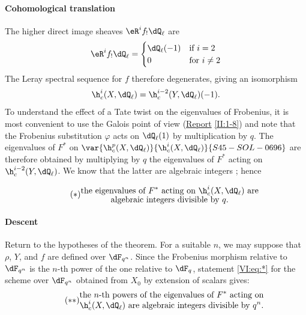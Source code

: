 \paragraph{Cohomological translation}
The higher direct image sheaves $\eR^i f_!\dQ_\ell$ are 
\[
  \eR^i f_!\dQ_\ell = \begin{cases}
                       \dQ_\ell(-1) & \text{if $i = 2$} \\
                       0            & \text{for $i\ne 2$}
                     \end{cases}
\]
The Leray spectral sequence for $f$ therefore degenerates, giving an isomorphism 
\[
  \h_c^i(X,\dQ_\ell) = \h_c^{i-2}(Y,\dQ_\ell)(-1) \text{.}
\]
To understand the effect of a Tate twist on the eigenvalues of 
Frobenius, it is most convenient to use the Galois point of view 
(\hyperref[II]{Report} \ref{II:1-8}) and note that the Frobenius substitution 
$\varphi$ acts on $\dQ_\ell(1)$ by multiplication by $q$. The 
eigenvalues of $F^\ast$ on $\var{\h_c^p(X,\dQ_\ell)}{\h_c^i(X,\dQ_\ell)}{S45-SOL-0696}$ are therefore obtained by 
multiplying by $q$ the eigenvalues of $F^\ast$ acting on $\h_c^{i-2}(Y,\dQ_\ell)$. We 
know that the latter are algebraic integers \cite[XXI 5.2.2]{sga7}; hence 

\begin{equation*}\tag{$*$}\label{VI:eq:*}
  \substack{\displaystyle\text{the eigenvalues of $F^\ast$ acting on $\h_c^i(X,\dQ_\ell)$ are} \\
  \displaystyle\text{algebraic integers divisible by $q$.}}
\end{equation*}


\paragraph{Descent}
Return to the hypotheses of the theorem. For a suitable $n$, we may 
suppose that $\rho$, $Y$, and $f$ are defined over $\dF_{q^n}$. Since the 
Frobenius morphism relative to $\dF_{q^n}$ is the $n$-th power of the one 
relative to $\dF_q$, statement \eqref{VI:eq:*} for the scheme over 
$\dF_{q^n}$ obtained from $X_0$ by extension of scalars gives: 
\begin{equation*}\tag{$**$}\label{VI:eq:**}
  \substack{\displaystyle\text{the $n$-th powers of the eigenvalues of $F^\ast$ acting on} \\ \displaystyle\text{$\h_c^i(X,\dQ_\ell)$ are algebraic integers divisible by $q^n$.}}
\end{equation*}

